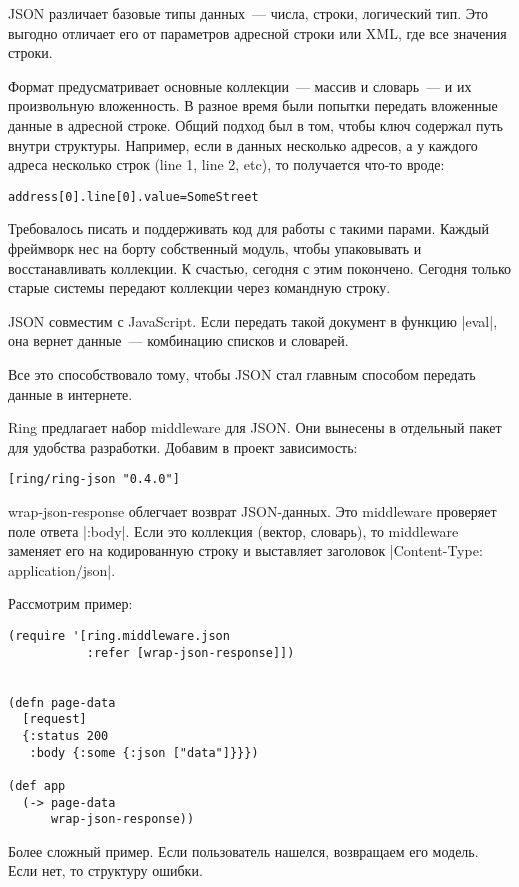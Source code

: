 JSON различает базовые типы данных~--- числа, строки, логический тип. Это выгодно
отличает его от параметров адресной строки или XML, где все значения строки.

Формат предусматривает основные коллекции~--- массив и словарь~--- и их произвольную
вложенность. В разное время были попытки передать вложенные данные в адресной
строке. Общий подход был в том, чтобы ключ содержал путь внутри
структуры. Например, если в данных несколько адресов, а у каждого адреса
несколько строк (line 1, line 2, etc), то получается что-то вроде:

\begin{verbatim}
address[0].line[0].value=SomeStreet
\end{verbatim}

Требовалось писать и поддерживать код для работы с такими парами. Каждый
фреймворк нес на борту собственный модуль, чтобы упаковывать и восстанавливать
коллекции. К счастью, сегодня с этим покончено. Сегодня только старые системы
передают коллекции через командную строку.

JSON совместим с JavaScript. Если передать такой документ в функцию \spverb|eval|, она
вернет данные~--- комбинацию списков и словарей.

Все это способствовало тому, чтобы JSON стал главным способом передать данные в
интернете.

Ring предлагает набор middleware для JSON. Они вынесены в отдельный пакет для
удобства разработки. Добавим в проект зависимость:

\begin{verbatim}
[ring/ring-json "0.4.0"]
\end{verbatim}

wrap-json-response облегчает возврат JSON-данных. Это middleware проверяет поле
ответа \spverb|:body|. Если это коллекция (вектор, словарь), то middleware заменяет его
на кодированную строку и выставляет заголовок \spverb|Content-Type: application/json|.


Рассмотрим пример:

\begin{verbatim}
(require '[ring.middleware.json
           :refer [wrap-json-response]])


(defn page-data
  [request]
  {:status 200
   :body {:some {:json ["data"]}}})

(def app
  (-> page-data
      wrap-json-response))
\end{verbatim}

Более сложный пример. Если пользователь нашелся, возвращаем его модель. Если
нет, то структуру ошибки.


